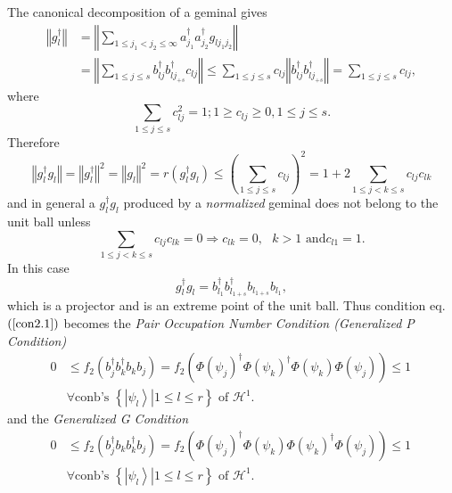 \documentclass[aps,preprint]{revtex4}%
\begin{document}
The canonical decomposition of a geminal gives
\begin{align}
\left\Vert g_{l}^{\dagger}\right\Vert  &  =\left\Vert \sum_{1\leq j_{1}%
<j_{2}\leq\infty}a_{j_{1}}^{\dagger}a_{j_{2}}^{\dagger}g_{lj_{1}j_{2}%
}\right\Vert \nonumber\\
&  =\left\Vert \sum_{1\leq j\leq s}b_{lj}^{\dagger}b_{lj_{+s}}^{\dagger}%
c_{lj}\right\Vert \leq\sum_{1\leq j\leq s}c_{lj}\left\Vert b_{lj}^{\dagger
}b_{lj_{+s}}^{\dagger}\right\Vert =\sum_{1\leq j\leq s}c_{lj},
\end{align}
where
\begin{equation}
\sum_{1\leq j\leq s}c_{lj}^{2}=1;1\geq c_{lj}\geq0,1\leq j\leq s.
\end{equation}
Therefore
\begin{equation}
\left\Vert g_{l}^{\dagger}g_{l}\right\Vert =\left\Vert g_{l}^{\dagger
}\right\Vert ^{2}=\left\Vert g_{l}\right\Vert ^{2}=r\left(  g_{l}^{\dagger
}g_{l}\right)  \leq\left(  \sum_{1\leq j\leq s}c_{lj}\right)  ^{2}%
=1+2\sum_{1\leq j<k\leq s}c_{lj}c_{lk}\nonumber
\end{equation}
and in general a $g_{l}^{\dagger}g_{l}$ produced by a \emph{normalized
}geminal does not belong to the unit ball unless
\begin{equation}
\sum_{1\leq j<k\leq s}c_{lj}c_{lk}=0\Rightarrow c_{lk}=0,\text{ }k>1\text{ and
}c_{l1}=1.
\end{equation}
In this case
\begin{equation}
g_{l}^{\dagger}g_{l}=b_{l_{1}}^{\dagger}b_{l_{1+s}}^{\dagger}b_{l_{1+s}%
}b_{l_{1}},
\end{equation}
which is a projector and is an extreme point of the unit ball. Thus condition
eq. $\left(  \ref{con2.1}\right)  $ becomes the \emph{Pair Occupation Number
Condition (Generalized P Condition)}
\begin{align}
0  &  \leq f_{2}\left(  b_{j}^{\dagger}b_{k}^{\dagger}b_{k}b_{j}\right)
=f_{2}\left(  \Phi\left(  \psi_{j}\right)  ^{\dagger}\Phi\left(  \psi
_{k}\right)  ^{\dagger}\Phi\left(  \psi_{k}\right)  \Phi\left(  \psi
_{j}\right)  \right)  \leq1\,\nonumber\\
&  \forall\text{conb's }\left\{  \left.  \left\vert \psi_{l}\right\rangle
\right\vert 1\leq l\leq r\right\}  \text{ of }\mathcal{H}^{1}.
\label{PairOcc1}%
\end{align}
and the \emph{Generalized G Condition }
\begin{align}
0  &  \leq f_{2}\left(  b_{j}^{\dagger}b_{k}b_{k}^{\dagger}b_{j}\right)
=f_{2}\left(  \Phi\left(  \psi_{j}\right)  ^{\dagger}\Phi\left(  \psi
_{k}\right)  \Phi\left(  \psi_{k}\right)  ^{\dagger}\Phi\left(  \psi
_{j}\right)  \right)  \leq1\,\nonumber\\
&  \forall\text{conb's }\left\{  \left.  \left\vert \psi_{l}\right\rangle
\right\vert 1\leq l\leq r\right\}  \text{ of }\mathcal{H}^{1}.
\label{PairOcc2}%
\end{align}
\end{document}
